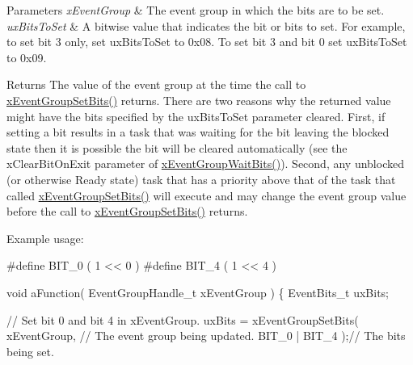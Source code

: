 \begin{DoxyParams}{Parameters}
{\em x\+Event\+Group} & The event group in which the bits are to be set.\\
\hline
{\em ux\+Bits\+To\+Set} & A bitwise value that indicates the bit or bits to set. For example, to set bit 3 only, set ux\+Bits\+To\+Set to 0x08. To set bit 3 and bit 0 set ux\+Bits\+To\+Set to 0x09.\\
\hline
\end{DoxyParams}
\begin{DoxyReturn}{Returns}
The value of the event group at the time the call to \hyperlink{event__groups_8h_a02d7b3bb55f7e11d9c47116266c5fb2e}{x\+Event\+Group\+Set\+Bits()} returns. There are two reasons why the returned value might have the bits specified by the ux\+Bits\+To\+Set parameter cleared. First, if setting a bit results in a task that was waiting for the bit leaving the blocked state then it is possible the bit will be cleared automatically (see the x\+Clear\+Bit\+On\+Exit parameter of \hyperlink{event__groups_8h_aab9d5b405bc57b7624dcabe9a9a503db}{x\+Event\+Group\+Wait\+Bits()}). Second, any unblocked (or otherwise Ready state) task that has a priority above that of the task that called \hyperlink{event__groups_8h_a02d7b3bb55f7e11d9c47116266c5fb2e}{x\+Event\+Group\+Set\+Bits()} will execute and may change the event group value before the call to \hyperlink{event__groups_8h_a02d7b3bb55f7e11d9c47116266c5fb2e}{x\+Event\+Group\+Set\+Bits()} returns.
\end{DoxyReturn}
Example usage\+: 
\begin{DoxyPre}
  #define BIT\_0 ( 1 << 0 )
  #define BIT\_4 ( 1 << 4 )\end{DoxyPre}



\begin{DoxyPre}  void aFunction( EventGroupHandle\_t xEventGroup )
  \{
  EventBits\_t uxBits;\end{DoxyPre}



\begin{DoxyPre}    // Set bit 0 and bit 4 in xEventGroup.
    uxBits = xEventGroupSetBits(
                        xEventGroup,    // The event group being updated.
                        BIT\_0 | BIT\_4 );// The bits being set.\end{DoxyPre}




